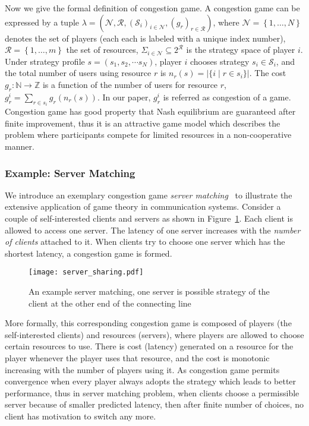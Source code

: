 Now we give the formal definition of congestion game.
A congestion game \cite{Rosenthal}\cite{Voecking06congestiongames} can be expressed by a tuple $\lambda=(\mathcal{N},\mathcal{R},(\mathcal{S}_i)_{i \in \mathcal{N}},(g_r)_{r\in \mathcal{R}})$, where $\mathcal{N}=\left\{1,\ldots,N\right\}$ denotes the set of players (each each is labeled with a unique index number), $\mathcal{R}=\left\{1,\ldots,m\right\}$ the set of resources, $\Sigma_{i\in\mathcal{N}} \subseteq 2^{\mathcal{R}}$ is the strategy space of player $i$. 
Under strategy profile $s=(s_1,s_2,\cdots s_N)$, player $i$ chooses strategy $s_i\in \mathcal{S}_i$, and the total number of users using resource $r$ is $n_r(s)=|\{i\mid r\in s_i\}|$. 
The cost $g_r: \mathbb{N}\rightarrow \mathbb{Z}$ is a function of the number of users for resource $r$, $g_r^i=\sum_{r\in s_i} g_r(n_r(s))$. 
In our paper, $g_r^i$ is referred as congestion of a game.
Congestion game has good property that Nash equilibrium are guaranteed after finite improvement, thus it is an attractive game model which describes the problem where participants compete for limited resources in a non-cooperative manner.


\subsubsection*{Example: Server Matching}
We introduce an exemplary congestion game \textit{server matching}~\cite{kothari:congestion_serverMatching} to illustrate the extensive application of game theory in communication systems.
Consider a couple of self-interested clients and servers as shown in Figure~\ref{server_sharing}.
Each client is allowed to access one server.
The latency of one server increases with the \textit{number of clients} attached to it.
When clients try to choose one server which has the shortest latency, a congestion game is formed.
\begin{figure}[h!]
  \centering
  \texttt{[image: server\_sharing.pdf]}
  \caption{An example server matching, one server is possible strategy of the client at the other end of the connecting line}
\label{server_sharing}
\end{figure}

More formally, this corresponding congestion game is composed of players (the self-interested clients) and resources (servers), where players are allowed to choose certain resources to use. 
There is cost (latency) generated on a resource for the player whenever the player uses that resource, and the cost is monotonic increasing with the number of players using it. 
As congestion game permits convergence when every player always adopts the strategy which leads to better performance, thus in server matching problem, when clients choose a permissible server because of smaller predicted latency, then after finite number of choices, no client has motivation to switch any more.

